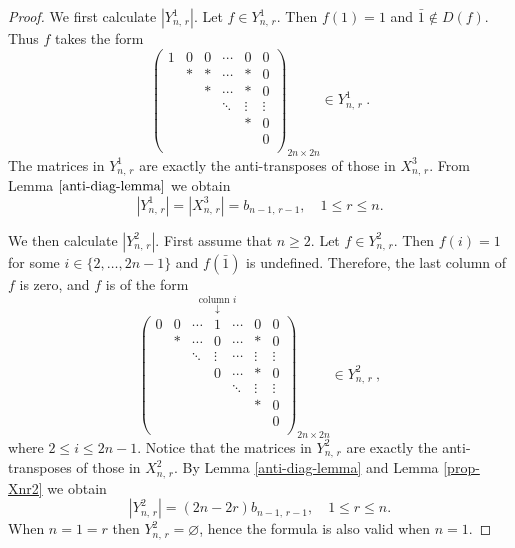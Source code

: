 \documentclass[11pt]{article}
\newcommand{\ges}{\geqslant}
\newcommand{\les}{\leqslant}
\begin{document}
\begin{proof}
We first calculate $|Y_{n,\,r}^1|$. Let $f\in Y_{n,\,r}^1$. Then $f(1)=1$ and $\bar{1}\notin D(f)$. Thus $f$ takes the form
\[
\begin{pmatrix}
            1 & 0 & 0 &\cdots & 0& 0 \\
              & * & * &\cdots & *& 0  \\
              &   & * &\cdots & *& 0 \\
              &   &   &\ddots &\vdots&\vdots \\
              &   &   &       & *& 0  \\
              &   &   &       &  & 0  \\
             \end{pmatrix}_{2n \times 2n}\in Y_{n,\,r}^1~.
\]
The matrices in $Y_{n,\,r}^1$ are exactly the anti-transposes of those in 
$X_{n,\,r}^3$. 
%
From Lemma $\ref{anti-diag-lemma}$ we obtain
\[\label{Ynr1}
   |Y_{n,\,r}^1| = |X_{n,\,r}^3| = b_{n-1, \,r-1},\quad 1\les r\les n.\tag{2}
\]

We then calculate $|Y_{n,\,r}^2|$. First assume that $n\ges 2.$ Let $f\in Y_{n,\,r}^2$. Then
 $f(i)=1$ for some $i \in \{2, \dots, 2n-1\}$ and $f(\bar{1})$ is undefined. Therefore, the last column of $f$ is zero, and $f$ is of the form
\[
\overset{\text{column } i}{\overset{\downarrow}{
\begin{pmatrix}
            0 & 0 & \cdots & 1&\cdots & 0& 0 \\
              & * & \cdots & 0&\cdots & *& 0 \\
              &   & \ddots &\vdots&\cdots & \vdots& \vdots \\
              &   &        &0 & \cdots& *& 0 \\
              &   &        &  &\ddots &\vdots&\vdots \\
              &   &        &  &       & *& 0  \\
              &   &        &  &       &  & 0  \\
             \end{pmatrix}}}_{2n \times 2n}\in Y_{n,\,r}^2~,
\]
where $2\les i\les 2n-1.$  
%
Notice that the matrices in $Y_{n,\,r}^2$ are exactly the anti-transposes of those in 
$X_{n,\,r}^2$. By Lemma \ref{anti-diag-lemma} and Lemma \ref{prop-Xnr2} we obtain
\[\label{Ynr2}
    |Y_{n,\,r}^2|= (2n-2r)b_{n-1, \,r-1},\quad 1\les r\les n. \tag{3}
\]
When $n=1=r$ then $Y^2_{n,\,r}=\varnothing$, hence the formula is also valid when $n=1$.


\end{proof}
\end{document}
